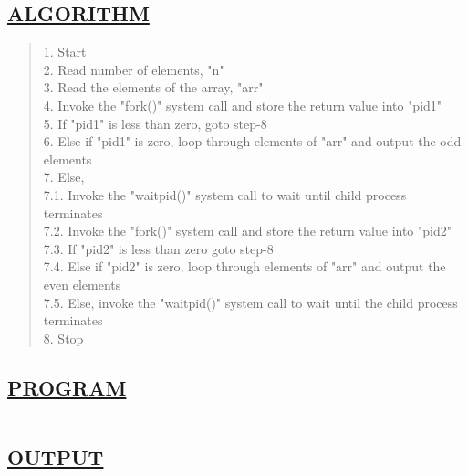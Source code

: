 \documentclass[a4paper, 12pt]{article}
\begin{document}
\subsection*{\underline{ALGORITHM}}
\begin{quote}
1. Start\\
2. Read number of elements, "n"\\
3. Read the elements of the array, "arr"\\
4. Invoke the "fork()" system call and store the return value into "pid1"\\
5. If "pid1" is less than zero, goto step-8\\
6. Else if "pid1" is zero, loop through elements of "arr" and output the odd elements\\
7. Else,\\
\hspace*{1cm} 7.1. Invoke the "waitpid()" system call to wait until child process terminates\\
\hspace*{1cm} 7.2. Invoke the "fork()" system call and store the return value into "pid2"\\
\hspace*{1cm} 7.3. If "pid2" is less than zero goto step-8\\
\hspace*{1cm} 7.4. Else if "pid2" is zero, loop through elements of "arr" and output the even \hspace*{2cm} elements\\
\hspace*{1cm} 7.5. Else, invoke the "waitpid()" system call to wait until the child process \hspace*{2cm} terminates\\
8. Stop\\
\end{quote}

\subsection*{\underline{PROGRAM}}
\begin{quote}
\inputminted[fontsize=\small,breaklines,breakanywhere]{c}{odd_even_processor.c}%
\end{quote}

\newpage
\subsection*{\underline{OUTPUT}}
\end{document}
